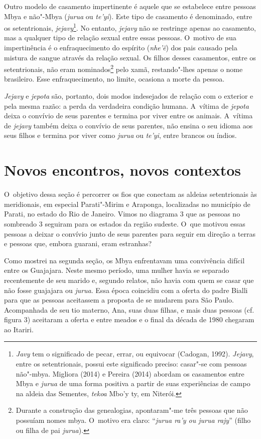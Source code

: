 Outro modelo de casamento impertinente é aquele que se estabelece entre
pessoas Mbya e não"-Mbya (\emph{jurua} ou \emph{te’yi}). Este tipo de casamento é
denominado, entre os setentrionais, \emph{jejavy}\footnote{\emph{Javy} tem o
significado de pecar, errar, ou equivocar (Cadogan, 1992). \emph{Jejavy},
entre os setentrionais, possui este significado preciso: casar"-se com
pessoas não"-mbya. Migliora (2014) e Pereira (2014) abordam os
casamentos entre Mbya e \emph{jurua} de uma forma positiva a partir de suas
experiências de campo na aldeia das Sementes, \emph{tekoa} Mbo’y ty, em
Niterói.}. No entanto, \emph{jejavy} não se restringe apenas ao casamento, mas
a qualquer tipo de relação sexual entre essas pessoas. O~motivo de sua
impertinência é o enfraquecimento do espírito (\emph{nhe’ë}) dos pais causado
pela mistura de sangue através da relação sexual. Os filhos desses
casamentos, entre os setentrionais, não eram nominados\footnote{Durante
a construção das genealogias, apontaram"-me três pessoas que não
possuíam nomes mbya. O~motivo era claro: ``\emph{jurua ra’y ou jurua rajy}''
(filho ou filha de pai \emph{jurua}).} pelo xamã, restando"-lhes apenas o nome
brasileiro. Esse enfraquecimento, no limite, ocasiona a morte da
pessoa.

\emph{Jejavy} e \emph{jepota} são, portanto, dois modos indesejados de relação com o
exterior e pela mesma razão: a perda da verdadeira condição humana.
A~vítima de \emph{jepota} deixa o convívio de seus parentes e termina por
viver entre os animais. A~vítima de \emph{jejavy} também deixa o convívio de
seus parentes, não ensina o seu idioma aos seus filhos e termina por
viver como \emph{jurua} ou \emph{te’yi}, entre brancos ou índios. 

\section{Novos encontros, novos contextos}

O~objetivo dessa seção é percorrer os fios que conectam as aldeias
setentrionais às meridionais, em especial Parati"-Mirim e Araponga,
localizadas no município de Parati, no estado do Rio de Janeiro. Vimos
no diagrama 3 que as pessoas no sombreado 3 seguiram para os estados da
região sudeste. O~que motivou essas pessoas a deixar o convívio junto
de seus parentes para seguir em direção a terras e pessoas que, embora
guarani, eram estranhas?

Como mostrei na segunda seção, os Mbya enfrentavam uma convivência
difícil entre os Guajajara. Neste mesmo período, uma mulher havia se
separado recentemente de seu marido e, segundo relatos, não havia com
quem se casar que não fosse guajajara ou \emph{jurua}. Essa época coincidiu
com a oferta do padre Bialli para que as pessoas aceitassem a proposta
de se mudarem para São Paulo. Acompanhada de seu tio materno, Ana, suas
duas filhas, e mais duas pessoas (cf. figura 3) aceitaram a oferta e
entre meados e o final da década de 1980 chegaram ao Itariri.

